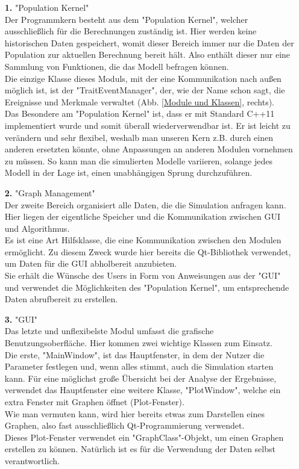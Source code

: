 \documentclass[11pt, a4paper, german]{article}
\theoremstyle{plain}
\begin{document}
	\begin{itemize}
		\item [\textbf{1.}] "{}Population Kernel"{}\\
		Der Programmkern besteht aus dem "{}Population Kernel"{}, welcher ausschließlich für die Berechnungen zuständig ist. Hier werden keine historischen Daten gespeichert, womit dieser Bereich immer nur die Daten der Population zur aktuellen Berechnung bereit hält. Also enthält dieser nur eine Sammlung von Funktionen, die das Modell befragen können.\\
		Die einzige Klasse dieses Moduls, mit der eine Kommunikation nach außen möglich ist, ist der "{}TraitEventManager"{}, der, wie der Name schon sagt, die Ereignisse und Merkmale verwaltet (Abb. \ref{Module und Klassen}, rechts).\\
		Das Besondere am "{}Population Kernel"{} ist, dass er mit Standard C++11 implementiert wurde und somit überall wiederverwendbar ist. Er ist leicht zu verändern und sehr flexibel, weshalb man unseren Kern z.B. durch einen anderen ersetzten könnte, ohne Anpassungen an anderen Modulen vornehmen zu müssen. So kann man die simulierten Modelle variieren, solange jedes Modell in der Lage ist, einen unabhängigen Sprung durchzuführen.\\
		\item [\textbf{2.}] "{}Graph Management"{}\\
		Der zweite Bereich organisiert alle Daten, die die Simulation anfragen kann. Hier liegen der eigentliche Speicher und die Kommunikation zwischen GUI und Algorithmus.\\
		Es ist eine Art Hilfsklasse, die eine Kommunikation zwischen den Modulen ermöglicht. Zu diesem Zweck wurde hier bereits die Qt-Bibliothek verwendet, um Daten für die GUI abholbereit anzubieten.\\
		Sie erhält die Wünsche des Users in Form von Anweisungen aus der "{}GUI"{} und verwendet die Möglichkeiten des "{}Population Kernel"{}, um entsprechende Daten abrufbereit zu erstellen.
		\item [\textbf{3.}] "{}GUI"{}\\
		Das letzte und unflexibelste Modul umfasst die grafische Benutzungsoberfläche. Hier kommen zwei wichtige Klassen zum Einsatz.\\
		Die erste, "{}MainWindow"{}, ist das Hauptfenster, in dem der Nutzer die Parameter festlegen und, wenn alles stimmt, auch die Simulation starten kann. Für eine möglichst große Übersicht bei der Analyse der Ergebnisse, verwendet das Hauptfenster eine weitere Klasse, "{}PlotWindow"{}, welche ein extra Fenster mit Graphen öffnet (Plot-Fenster).\\
		Wie man vermuten kann, wird hier bereits etwas zum Darstellen eines Graphen, also fast ausschließlich Qt-Programmierung verwendet.\\
		Dieses Plot-Fenster verwendet ein "{}GraphClass"{}-Objekt, um einen Graphen erstellen zu können. Natürlich ist es für die Verwendung der Daten selbst verantwortlich.
	\end{itemize}	
 	
\end{document}
